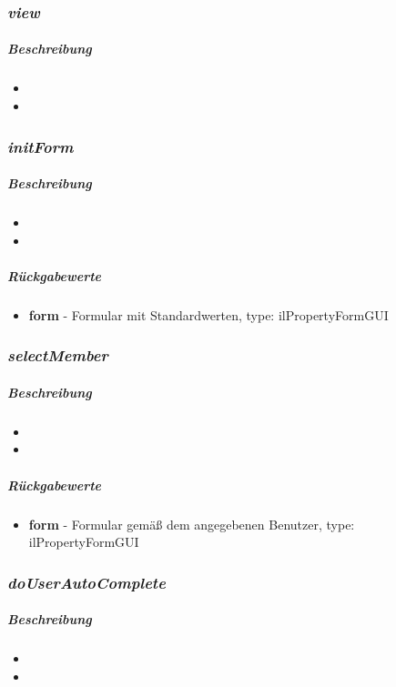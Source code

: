 \subsubsection*{\textit{view}}\label{viewMGUI}
\subparagraph{Beschreibung}
\begin{itemize}
	\item[] \noindent{} 
	\item[] 
\end{itemize}

\subsubsection*{\textit{initForm}}\label{initFormMGUI}
\subparagraph{Beschreibung}
\begin{itemize}
	\item[] \noindent{} 
	\item[] 
\end{itemize}
\subparagraph{Rückgabewerte}
\begin{itemize}
\item[] \textbf{form} - Formular mit Standardwerten, type: ilPropertyFormGUI
\end{itemize}

\subsubsection*{\textit{selectMember}}\label{selectMemberMGUI}
\subparagraph{Beschreibung}
\begin{itemize}
	\item[] \noindent{} 
	\item[] 
\end{itemize}
\subparagraph{Rückgabewerte}
\begin{itemize}
	\item[] \textbf{form} - Formular gemäß dem angegebenen Benutzer, type: ilPropertyFormGUI
\end{itemize}

\subsubsection*{\textit{doUserAutoComplete}}\label{doUserAutoCompleteMGUI}
\subparagraph{Beschreibung}
\begin{itemize}
	\item[] \noindent{} 
	\item[] 
\end{itemize}

